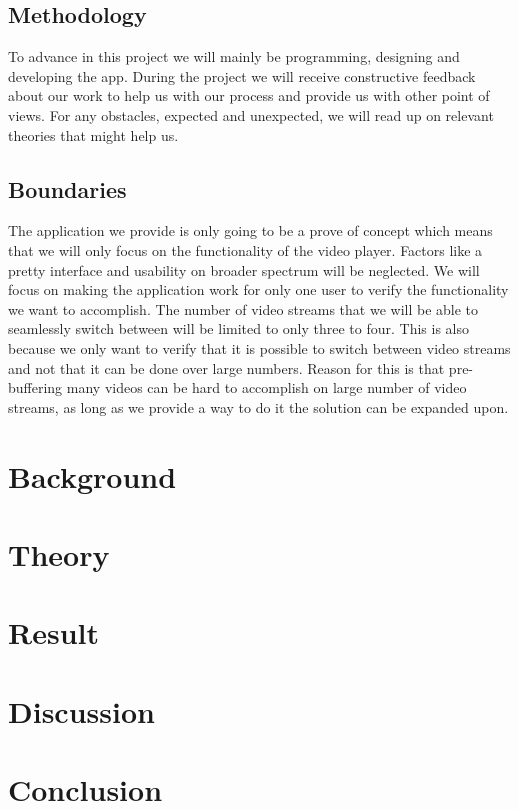 \documentclass[9pt,a4paper]{acmproc}
\begin{document}
\subsection{Methodology}
To advance in this project we will mainly be programming, designing and developing the app. During the project we will receive constructive feedback about our work to help us with our process and provide us with other point of views. For any obstacles, expected and unexpected, we will read up on relevant theories that might help us.

\subsection{Boundaries}
The application we provide is only going to be a prove of concept which means that we will only focus on the functionality of the video player. Factors like a pretty interface and usability on broader spectrum will be neglected. We will focus on making the application work for only one user to verify the functionality we want to accomplish. The number of video streams that we will be able to seamlessly switch between will be limited to only three to four. This is also because we only want to verify that it is possible to switch between video streams and not that it can be done over large numbers. Reason for this is that pre-buffering many videos can be hard to accomplish on large number of video streams, as long as we provide a way to do it the solution can be expanded upon.

\clearpage

\section{Background}

\section{Theory}

\section{Result}

\section{Discussion}

\section{Conclusion}
\end{document}
